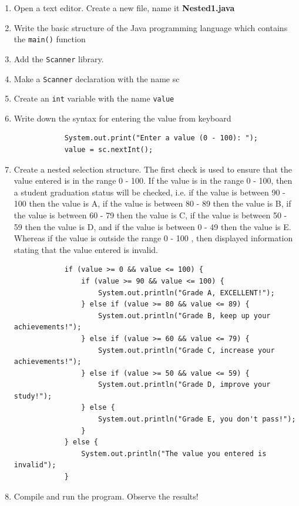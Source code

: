 \documentclass[12pt,titlepage]{article}
\begin{document}
\begin{enumerate}
    \item Open a text editor. Create a new file, name it \textbf{Nested1.java}
    \item Write the basic structure of the Java programming language which contains the \texttt{main()} function
    \item Add the \texttt{Scanner} library.
    \item Make a \texttt{Scanner} declaration with the name sc
    \item Create an \texttt{int} variable with the name \texttt{value}
    \item {
        Write down the syntax for entering the value from keyboard

        \begin{verbatim}
            System.out.print("Enter a value (0 - 100): ");
            value = sc.nextInt();
        \end{verbatim}
    }
    \item {
        Create a nested selection structure. The first check is used to ensure that the value
        entered is in the range 0 - 100. If the value is in the range 0 - 100, then a student
        graduation status will be checked, i.e. if the value is between 90 - 100 then the value is
        A, if the value is between 80 - 89 then the value is B, if the value is between 60 - 79 then
        the value is C, if the value is between 50 - 59 then the value is D, and if the value is
        between 0 - 49 then the value is E. Whereas if the value is outside the range 0 - 100 , then
        displayed information stating that the value entered is invalid.

        \begin{verbatim}
            if (value >= 0 && value <= 100) {
                if (value >= 90 && value <= 100) {
                    System.out.println("Grade A, EXCELLENT!");
                } else if (value >= 80 && value <= 89) {
                    System.out.println("Grade B, keep up your achievements!");
                } else if (value >= 60 && value <= 79) {
                    System.out.println("Grade C, increase your achievements!");
                } else if (value >= 50 && value <= 59) {
                    System.out.println("Grade D, improve your study!");
                } else {
                    System.out.println("Grade E, you don't pass!");
                }
            } else {
                System.out.println("The value you entered is invalid");
            }
        \end{verbatim}
    }
    \pagebreak
    \item {
        Compile and run the program. Observe the results!

}
\end{enumerate}
\end{document}
